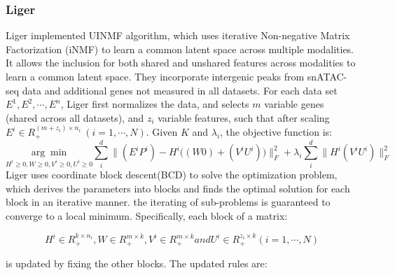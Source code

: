 \subsubsection{Liger}
Liger implemented UINMF algorithm, which uses iterative Non-negative Matrix Factorization (iNMF) to learn a common latent space across multiple modalities. It allows the inclusion for both shared and unshared features across modalities to learn a common latent space. They incorporate intergenic peaks from snATAC-seq data and additional genes not measured in all datasets. For each data set $E^1, E^2, \cdots, E^n$, Liger first normalizes the data, and selects $m$ variable genes (shared across all datasets), and $z_i$ variable features, such that after scaling $E^i \in R_{+}^{(m+z_i)\times n_i}\ (i=1,\cdots,N)$. Given $K$ and $\lambda_i$, the objective function is:
\begin{equation}
	\underset{H^i\geq 0,W\geq 0, V^i\geq 0, U^i \geq 0}{\arg\min} \sum_i^{d}\Big\| (E^i P^i) - H^i \big((W 0) + (V^i U^i)\big)\Big\|_{F}^2 + \lambda_i\sum_i^d\Big\|H^i(V^i U^i)\Big\|_{F}^2
\end{equation}
Liger uses coordinate block descent(BCD) to solve the optimization problem, which derives the parameters into blocks and finds the optimal solution for each block in an iterative manner. the iterating of sub-problems is guaranteed to converge to a local minimum. Specifically, each block of a matrix:

\begin{equation} 
	H^i \in R_+^{k\times n_i}, W \in R_+^{m\times k}, V^i \in R_+^{m\times k} and  U^i \in R_+^{z_i\times k}(i = 1,\cdots, N)
\end{equation}

is updated by fixing the other blocks. The updated rules are:

